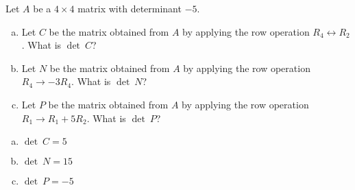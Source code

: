 
\begin{exerciseStatement}


Let \(A\) be a \(4 \times 4\) matrix with determinant \( -5 \).


\begin{enumerate}[(a)]
\item Let \(C\) be the matrix obtained from \(A\) by applying the row operation \( R_4 \leftrightarrow R_2 \). What is \(\operatorname{det}\ C\)?
\item Let \(N\) be the matrix obtained from \(A\) by applying the row operation \( R_4 \to -3R_4 \). What is \(\operatorname{det}\ N\)?
\item Let \(P\) be the matrix obtained from \(A\) by applying the row operation \( R_1 \to R_1 + 5R_2 \). What is \(\operatorname{det}\ P\)?
\end{enumerate}
    
\end{exerciseStatement}
    
\begin{exerciseAnswer} 

\begin{enumerate}[(a)]
\item \(\operatorname{det}\ C= 5 \)
\item \(\operatorname{det}\ N= 15 \)
\item \(\operatorname{det}\ P= -5 \)
\end{enumerate}
    
\end{exerciseAnswer}
    
